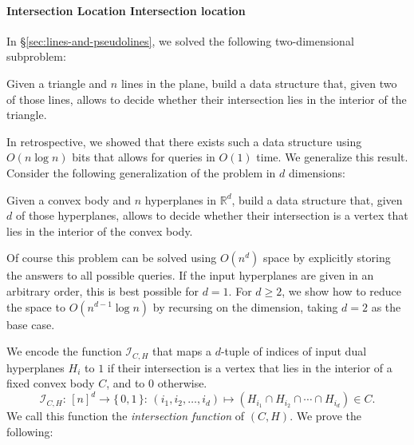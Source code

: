 \paragraph*{\iftitlecase%
Intersection Location\else%
Intersection location\fi}

In \S\ref{sec:lines-and-pseudolines}, we solved the following two-dimensional subproblem:

\begin{problem}
  Given a triangle and \(n\) lines in the plane, build a data structure that,
  given two of those lines, allows to decide whether their intersection
  lies in the interior of the triangle.
\end{problem}

In retrospective, we showed that there exists such a data structure using
\(O(n \log n)\) bits that allows for queries in \(O(1)\) time. We generalize
this result. Consider the following generalization of the problem in
\(d\) dimensions:

\begin{problem}
  Given a convex body and \(n\) hyperplanes in \(\mathbb{R}^d\), build a data
  structure that, given \(d\) of those hyperplanes, allows to decide whether their
  intersection is a vertex that lies in the interior of the convex body.
\end{problem}

Of course this problem can be solved using \(O(n^d)\) space by explicitly
storing the answers to all possible queries. If the input hyperplanes are
given in an arbitrary order, this is best possible for
\(d=1\). For \(d \geq 2\), we show how to reduce the space to \(O(n^{d-1} \log
n)\) by recursing on the dimension, taking \(d = 2\) as the base case.

We encode the function \(\mathcal{I}_{C, H}\)
that maps a \(d\)-tuple of indices of input dual
hyperplanes \(H_i\) to \(1\) if their intersection is a vertex that lies in the
interior of a fixed convex body \(C\), and to \(0\) otherwise.
%
\begin{displaymath}
  \mathcal{I}_{C,H} \colon\, {[n]}^d \to \{\, 0,1\,\} \colon\,
  (i_1,i_2,\ldots,i_d) \mapsto
  (H_{i_1} \cap H_{i_2} \cap \cdots \cap H_{i_d})
  \in  C.
\end{displaymath}
%
We call this function the \emph{intersection function} of \((C,H)\).
%
We prove the following:


